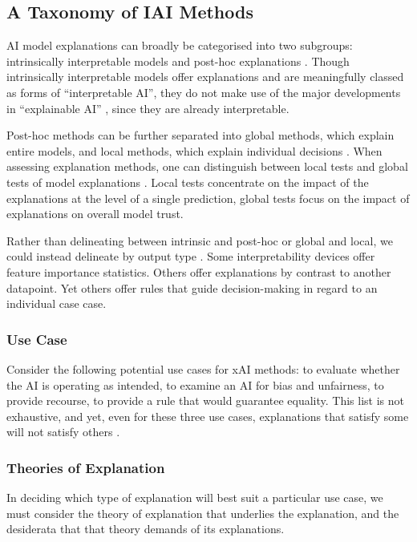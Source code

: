 \subsection{A Taxonomy of IAI Methods}
AI model explanations can broadly be categorised into two subgroups: intrinsically interpretable models and post-hoc explanations \cite{molnar_interpretable_2019}. Though intrinsically interpretable models offer explanations and are meaningfully classed as forms of “interpretable AI”, they do not make use of the major developments in “explainable AI” \cite{molnar_interpretable_2019}, since they are already interpretable.

Post-hoc methods can be further separated into global methods, which explain entire models, and local methods, which explain individual decisions \cite{molnar_interpretable_2019}. When assessing explanation methods, one can distinguish between local tests and global tests of model explanations \cite{molnar_interpretable_2019}. Local tests concentrate on the impact of the explanations at the level of a single prediction, global tests focus on the impact of explanations on overall model trust.

Rather than delineating between intrinsic and post-hoc or global and local, we could instead delineate by output type \cite{friedrich_taxonomy_2011}. Some interpretability devices offer feature importance statistics. Others offer explanations by contrast to another datapoint. Yet others offer rules that guide decision-making in regard to an individual case case.

\subsubsection{Use Case}
Consider the following potential use cases for xAI methods: to evaluate whether the AI is operating as intended, to examine an AI for bias and unfairness, to provide recourse, to provide a rule that would guarantee equality. This list is not exhaustive, and yet, even for these three use cases, explanations that satisfy some will not satisfy others \cite{natarajan_trust_2023}.

\subsubsection{Theories of Explanation}
In deciding which type of explanation will best suit a particular use case, we must consider the theory of explanation that underlies the explanation, and the desiderata that that theory demands of its explanations.

